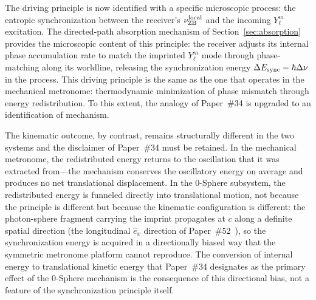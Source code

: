 \documentclass[%
 reprint, amsmath,amssymb, aps, prb, ]{revtex4-2}
\numberwithin{equation}{section}
\newcommand{\nuZBl}{\nu_{\text{ZB}}^{\rm local}}
\newcommand{\ehat}[1]{\hat{e}_{#1}}
\begin{document}
The driving principle is now identified with a specific microscopic process: the entropic synchronization between the receiver's $\nuZBl$ and the incoming $Y_\ell^m$ excitation. The directed-path absorption mechanism of Section~\ref{sec:absorption} provides the microscopic content of this principle: the receiver adjusts its internal phase accumulation rate to match the imprinted $Y_\ell^m$ mode through phase-matching along its worldline, releasing the synchronization energy $\Delta E_{\rm sync} = \hbar\Delta\nu$ in the process. This driving principle is the same as the one that operates in the mechanical metronome: thermodynamic minimization of phase mismatch through energy redistribution. To this extent, the analogy of Paper~\#34 is upgraded to an identification of mechanism.

The kinematic outcome, by contrast, remains structurally different in the two systems and the disclaimer of Paper~\#34 must be retained. In the mechanical metronome, the redistributed energy returns to the oscillation that it was extracted from---the mechanism conserves the oscillatory energy on average and produces no net translational displacement. In the 0-Sphere subsystem, the redistributed energy is funneled directly into translational motion, not because the principle is different but because the kinematic configuration is different: the photon-sphere fragment carrying the imprint propagates at $c$ along a definite spatial direction (the longitudinal $\ehat{x}$ direction of Paper~\#52~\cite{hanamura52}), so the synchronization energy is acquired in a directionally biased way that the symmetric metronome platform cannot reproduce. The conversion of internal energy to translational kinetic energy that Paper~\#34 designates as the primary effect of the 0-Sphere mechanism is the consequence of this directional bias, not a feature of the synchronization principle itself.
\end{document}
